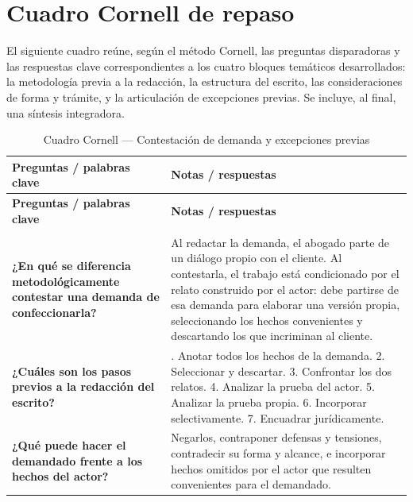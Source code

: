 \documentclass[12pt,oneside]{book}
\begin{document}
\chapter{Cuadro Cornell de repaso}

El siguiente cuadro reúne, según el método Cornell, las preguntas disparadoras y las respuestas clave correspondientes a los cuatro bloques temáticos desarrollados: la metodología previa a la redacción, la estructura del escrito, las consideraciones de forma y trámite, y la articulación de excepciones previas. Se incluye, al final, una síntesis integradora.

\begin{longtable}{
    >{\raggedright\arraybackslash}p{}
    >{\raggedright\arraybackslash}p{}
}
\caption{Cuadro Cornell — Contestación de demanda y excepciones previas} \\
\toprule
\textbf{Preguntas / palabras clave} & \textbf{Notas / respuestas} \\
\midrule
\endfirsthead

\toprule
\textbf{Preguntas / palabras clave} & \textbf{Notas / respuestas} \\
\midrule
\endhead

\midrule
\multicolumn{2}{r}{\textit{Continúa en la página siguiente}} \\
\endfoot

\bottomrule
\endlastfoot

\textbf{¿En qué se diferencia metodológicamente contestar una demanda de confeccionarla?} &
Al redactar la demanda, el abogado parte de un diálogo propio con el cliente. Al contestarla, el trabajo está condicionado por el relato construido por el actor: debe partirse de esa demanda para elaborar una versión propia, seleccionando los hechos convenientes y descartando los que incriminan al cliente. \\

\textbf{¿Cuáles son los pasos previos a la redacción del escrito?} &
1. Anotar todos los hechos de la demanda. 2. Seleccionar y descartar. 3. Confrontar los dos relatos. 4. Analizar la prueba del actor. 5. Analizar la prueba propia. 6. Incorporar selectivamente. 7. Encuadrar jurídicamente. \\

\textbf{¿Qué puede hacer el demandado frente a los hechos del actor?} &
Negarlos, contraponer defensas y tensiones, contradecir su forma y alcance, e incorporar hechos omitidos por el actor que resulten convenientes para el demandado. \\


\end{longtable}
\end{document}
